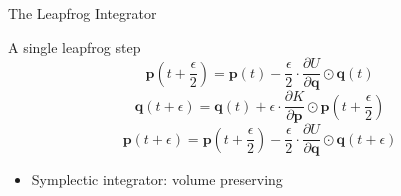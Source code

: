 \documentclass{beamer}
\renewcommand{\vec}[1]{\ensuremath{\mathbf{#1}}}
\begin{document}
    \begin{frame}{The Leapfrog Integrator}

        \begin{block}{A single leapfrog step}
            \begin{equation*}
                \vec{p}\left(t+\frac{\epsilon}{2}\right) = \vec{p}\left(t\right) - \frac{\epsilon}{2} \cdot \frac{\partial U}{\partial \vec{q}} \odot \vec{q}\left(t\right)
            \end{equation*}
            \pause
            \begin{equation*}
                \vec{q}\left(t+\epsilon\right) = \vec{q}\left(t\right) + \epsilon \cdot \frac{\partial K}{\partial \vec{p}} \odot \vec{p}\left(t+\frac{\epsilon}{2}\right)
            \end{equation*}
            \pause
            \begin{equation*}
                \vec{p}\left(t+\epsilon\right) = \vec{p}\left(t + \frac{\epsilon}{2}\right) - \frac{\epsilon}{2} \cdot \frac{\partial U}{\partial \vec{q}} \odot \vec{q}\left(t+\epsilon\right)
            \end{equation*}
        \end{block}

        \begin{itemize}
            \item Symplectic integrator: volume preserving
        \end{itemize}

    \end{frame}
\end{document}

